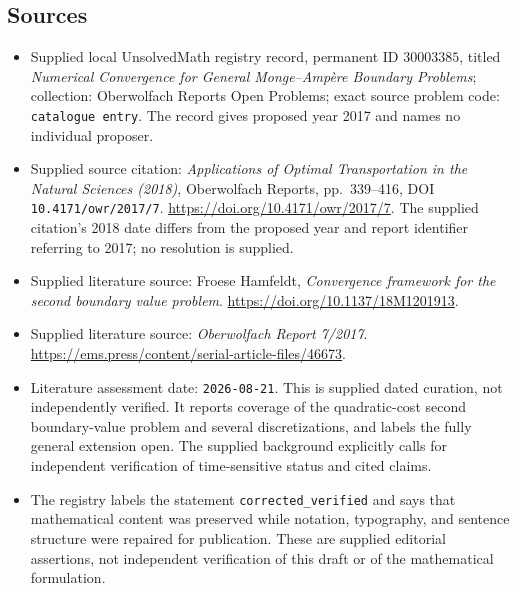 \documentclass[11pt]{article}
\begin{document}
\subsection{Sources}
\begin{itemize}
\item Supplied local UnsolvedMath registry record, permanent ID \(30003385\), titled \emph{Numerical Convergence for General Monge--Amp\`ere Boundary Problems}; collection: Oberwolfach Reports Open Problems; exact source problem code: \texttt{catalogue entry}. The record gives proposed year 2017 and names no individual proposer.
\item Supplied source citation: \emph{Applications of Optimal Transportation in the Natural Sciences (2018)}, Oberwolfach Reports, pp.~339--416, DOI \texttt{10.4171/owr/2017/7}. \url{https://doi.org/10.4171/owr/2017/7}. The supplied citation's 2018 date differs from the proposed year and report identifier referring to 2017; no resolution is supplied.
\item Supplied literature source: Froese Hamfeldt, \emph{Convergence framework for the second boundary value problem}. \url{https://doi.org/10.1137/18M1201913}.
\item Supplied literature source: \emph{Oberwolfach Report 7/2017}. \url{https://ems.press/content/serial-article-files/46673}.
\item Literature assessment date: \texttt{2026-08-21}. This is supplied dated curation, not independently verified. It reports coverage of the quadratic-cost second boundary-value problem and several discretizations, and labels the fully general extension open. The supplied background explicitly calls for independent verification of time-sensitive status and cited claims.
\item The registry labels the statement \texttt{corrected\_verified} and says that mathematical content was preserved while notation, typography, and sentence structure were repaired for publication. These are supplied editorial assertions, not independent verification of this draft or of the mathematical formulation.
\end{itemize}
\end{document}
